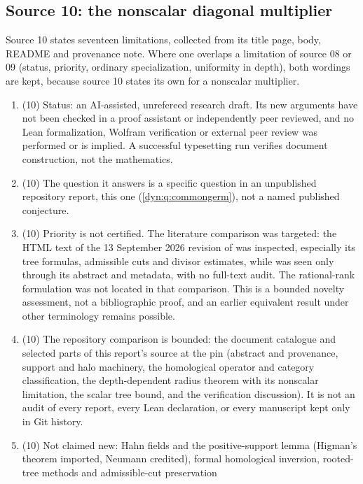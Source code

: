 \documentclass[11pt,letterpaper]{article}
\theoremstyle{definition}
\theoremstyle{remark}
\numberwithin{equation}{section}
\begin{document}
\subsection{Source 10: the nonscalar diagonal multiplier}
\label{dyn:nsc:subsec:nonclaims}
Source 10 states seventeen limitations, collected from its title page,
body, README and provenance note. Where one overlaps a limitation of
source 08 or 09 (status, priority, ordinary specialization, uniformity in
depth), both wordings are kept, because source 10 states its own for a
nonscalar multiplier.
\begin{enumerate}[label=\textbf{N\arabic*.},ref=\textbf{N\arabic*},leftmargin=3.2em,start=109]
\item (10) Status: an AI-assisted, unrefereed research draft. Its new
arguments have not been checked in a proof assistant or independently peer
reviewed, and no Lean formalization, Wolfram verification or external peer
review was performed or is implied. A successful typesetting run verifies
document construction, not the mathematics.
\item (10) The question it answers is a specific question in an unpublished
repository report, this one (\cref{dyn:q:commongerm}), not a named published
conjecture.
\item\label{dyn:nsc:nc:priority} (10) Priority is not certified. The
literature comparison was targeted: the HTML text of the 13 September 2026
revision of \cite{FMS26} was inspected, especially its tree formulas,
admissible cuts and divisor estimates, while \cite{CarlettiLagrange} was
seen only through its abstract and metadata, with no full-text audit. The
rational-rank formulation was not located in that comparison. This is a
bounded novelty assessment, not a bibliographic proof, and an earlier
equivalent result under other terminology remains possible.
\item (10) The repository comparison is bounded: the document catalogue and
selected parts of this report's source at the pin (abstract and provenance,
support and halo machinery, the homological operator and category
classification, the depth-dependent radius theorem with its nonscalar
limitation, the scalar tree bound, and the verification discussion). It is
not an audit of every report, every Lean declaration, or every manuscript
kept only in Git history.
\item (10) Not claimed new: Hahn fields and the positive-support lemma
(Higman's theorem imported, Neumann credited), formal homological
inversion, rooted-tree methods and admissible-cut preservation

\end{enumerate}
\end{document}
